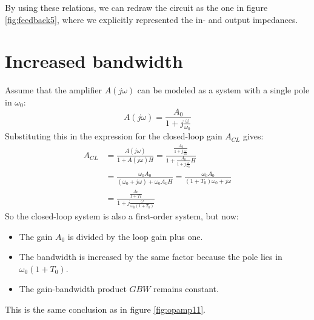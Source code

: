 By using these relations, we can redraw the circuit as the one in figure \ref{fig:feedback5}, where we explicitly represented the in- and output impedances.

\section{Increased bandwidth}
Assume that the amplifier $A(j \omega)$ can be modeled as a system with a single pole in $\omega_0$:
$$
A(j \omega) = \frac{A_0}{1 + j \frac{\omega}{\omega_0}}
$$
Substituting this in the expression for the closed-loop gain $A_{CL}$ gives:
\begin{align*}
	A_{CL} &= \frac{A(j\omega)}{1 + A(j \omega) H} = \frac{\frac{A_0}{1 + j \frac{\omega}{\omega_0}}}{1 + \frac{A_0}{1 + j \frac{\omega}{\omega_0}} H} \\
			&= \frac{\omega_0 A_0}{(\omega_0 + j\omega) + \omega_0 A_0 H} = \frac{\omega_0 A_0}{(1 + T_0) \omega_0 + j\omega} \\
			&= \frac{\frac{A_0}{1 + T_0}}{1 + j \frac{\omega}{\omega_0 (1 + T_0)}}
\end{align*}
So the closed-loop system is also a first-order system, but now:
\begin{itemize}
	\item The gain $A_0$ is divided by the loop gain plus one.
	\item The bandwidth is increased by the same factor because the pole lies in $\omega_0 (1 + T_0)$.
	\item The gain-bandwidth product $GBW$ remains constant.
\end{itemize}
This is the same conclusion as in figure \ref{fig:opamp11}.

